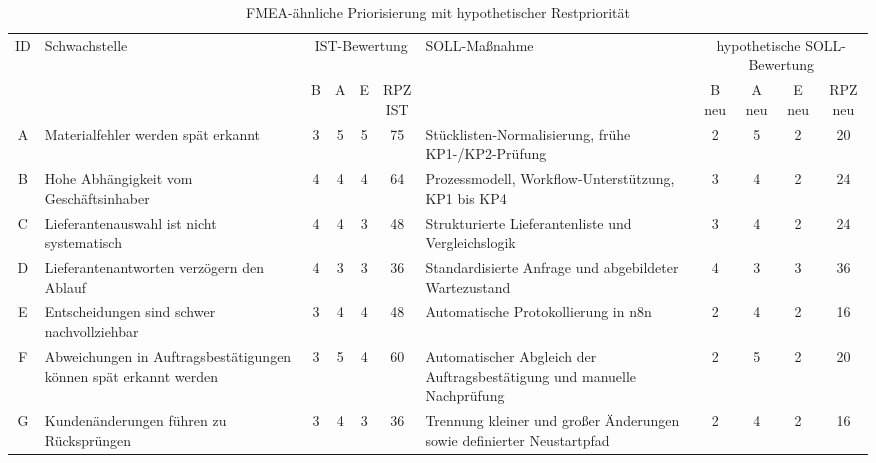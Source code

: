 \documentclass[a4paper,12pt]{article}
\newcommand{\LandscapePageNumbersOff}{%
    \ClearShipoutPictureFG%
    \pagestyle{appendixpages}%
}
\begin{document}
\begin{landscape}
\begin{table}[H]
    \centering
    \caption{FMEA-ähnliche Priorisierung mit hypothetischer Restpriorität}
    \label{tab:fmea-priorisierung-risikoreduktion}
    \small
    \setlength{\tabcolsep}{1.8pt}
    \renewcommand{\arraystretch}{1.18}
    \renewcommand{\tabularxcolumn}[1]{m{#1}}
\begin{tabularx}{\linewidth}{@{}c>{\raggedright\arraybackslash}m{6.5cm}cccc>{\centering\arraybackslash}Xcccc@{}}
        \toprule
        ID &
        Schwachstelle &
        \multicolumn{4}{c}{IST-Bewertung} &
        SOLL-Maßnahme &
        \multicolumn{4}{c}{hypothetische SOLL-Bewertung} \\
        \cmidrule(lr){3-6}\cmidrule(l){8-11}
        & &
        B &
        A &
        E &
        \shortstack{RPZ\\IST} &
        &
        \shortstack{B\\neu} &
        \shortstack{A\\neu} &
        \shortstack{E\\neu} &
        \shortstack{RPZ\\neu} \\
        \midrule
        A & Materialfehler werden spät erkannt & 3 & 5 & 5 & 75 & Stücklisten-Normalisierung, frühe KP1-/KP2-Prüfung & 2 & 5 & 2 & 20 \\
        B & Hohe Abhängigkeit vom Geschäftsinhaber & 4 & 4 & 4 & 64 & Prozessmodell, Workflow-Unterstützung, KP1 bis KP4 & 3 & 4 & 2 & 24 \\
        C & Lieferantenauswahl ist nicht systematisch & 4 & 4 & 3 & 48 & Strukturierte Lieferantenliste und Vergleichslogik & 3 & 4 & 2 & 24 \\
        D & Lieferantenantworten verzögern den Ablauf & 4 & 3 & 3 & 36 & Standardisierte Anfrage und abgebildeter Wartezustand & 4 & 3 & 3 & 36 \\
        E & Entscheidungen sind schwer nachvollziehbar & 3 & 4 & 4 & 48 & Automatische Protokollierung in n8n & 2 & 4 & 2 & 16 \\
        F & Abweichungen in Auftragsbestätigungen können spät erkannt werden & 3 & 5 & 4 & 60 & Automatischer Abgleich der Auftragsbestätigung und manuelle Nachprüfung & 2 & 5 & 2 & 20 \\
        G & Kundenänderungen führen zu Rücksprüngen & 3 & 4 & 3 & 36 & Trennung kleiner und großer Änderungen sowie definierter Neustartpfad & 2 & 4 & 2 & 16 \\
        \bottomrule
    \end{tabularx}
\end{table}
\end{landscape}
\LandscapePageNumbersOff
\restoregeometry
\end{document}
